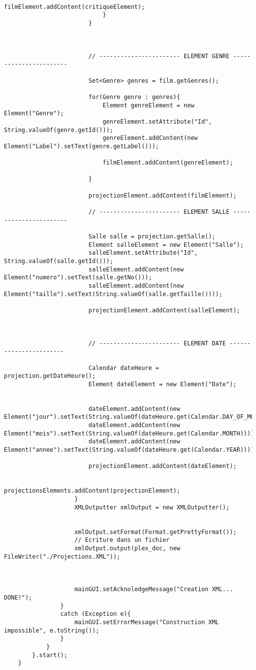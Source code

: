 \documentclass[a4paper]{article} %
\begin{document}
\begin{lstlisting}
								filmElement.addContent(critiqueElement);
							}
						}



						// ----------------------- ELEMENT GENRE -----------------------

						Set<Genre> genres = film.getGenres();

						for(Genre genre : genres){
							Element genreElement = new Element("Genre");
							genreElement.setAttribute("Id", String.valueOf(genre.getId()));
							genreElement.addContent(new Element("Label").setText(genre.getLabel()));

							filmElement.addContent(genreElement);

						}

						projectionElement.addContent(filmElement);

						// ----------------------- ELEMENT SALLE -----------------------

						Salle salle = projection.getSalle();
						Element salleElement = new Element("Salle");
						salleElement.setAttribute("Id", String.valueOf(salle.getId()));
						salleElement.addContent(new Element("numero").setText(salle.getNo()));
						salleElement.addContent(new Element("taille").setText(String.valueOf(salle.getTaille())));

						projectionElement.addContent(salleElement);



						// ----------------------- ELEMENT DATE -----------------------

						Calendar dateHeure = projection.getDateHeure();
						Element dateElement = new Element("Date");


						dateElement.addContent(new Element("jour").setText(String.valueOf(dateHeure.get(Calendar.DAY_OF_MONTH))));
						dateElement.addContent(new Element("mois").setText(String.valueOf(dateHeure.get(Calendar.MONTH))));
						dateElement.addContent(new Element("annee").setText(String.valueOf(dateHeure.get(Calendar.YEAR))));

						projectionElement.addContent(dateElement);

						projectionsElements.addContent(projectionElement);
					}
					XMLOutputter xmlOutput = new XMLOutputter();


					xmlOutput.setFormat(Format.getPrettyFormat());
					// Ecriture dans un fichier
					xmlOutput.output(plex_doc, new FileWriter("./Projections.XML"));



					mainGUI.setAcknoledgeMessage("Creation XML... DONE!");
				}
				catch (Exception e){
					mainGUI.setErrorMessage("Construction XML impossible", e.toString());
				}
			}
		}.start();
	}
\end{lstlisting}
\end{document}
